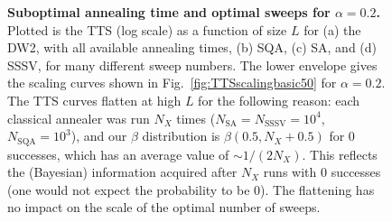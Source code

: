 \begin{figure}[t]
\caption{\textbf{Suboptimal annealing time and optimal sweeps for $\alpha=0.2$.} Plotted is the TTS (log scale) as a function of size $L$ for (a) the DW2, with all available annealing times, (b) SQA, (c) SA, and (d) SSSV, for many different sweep numbers. The lower envelope gives the scaling curves shown in Fig.~\ref{fig:TTSscalingbasic50} for $\alpha=0.2$. The TTS curves flatten at high $L$ for the following reason: each classical annealer was run $N_X$ times ($N_{\textrm{SA}}=N_{\textrm{SSSV}}=10^4$, $N_{\textrm{SQA}}=10^3$), and our $\beta$ distribution is $\beta(0.5,N_X+0.5)$ for $0$ successes, which has an average value of $\sim 1/(2N_X)$. This reflects the (Bayesian) information acquired after $N_X$ runs with $0$ successes (one would not expect the probability to be $0$). The flattening has no impact on the scale of the optimal number of sweeps.}
\label{fig:all-opt}
\end{figure}

